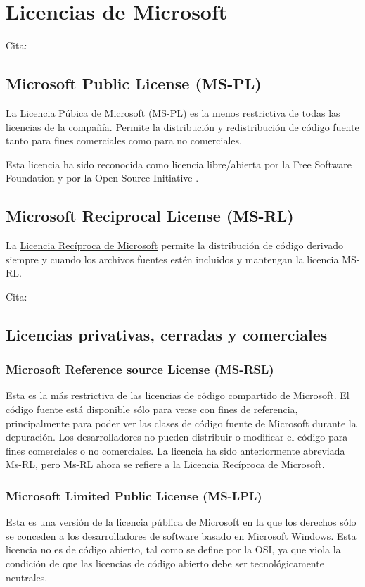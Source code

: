 \documentclass[10pt, titlepage]{article}
\begin{document}
\section{Licencias de Microsoft}
Cita: \cite{desde_linux_2020}

\subsection{Microsoft Public License (MS-PL)}
La \href{https://opensource.org/licenses/MS-PL}{Licencia Púbica de Microsoft (MS-PL)} \cite{microsoft_public_license_mspl} es la menos restrictiva de todas las licencias de la compañía. Permite la distribución y redistribución de código fuente tanto para fines comerciales como para no comerciales.

Esta licencia ha sido reconocida como licencia libre/abierta por la Free Software Foundation y por la Open Source Initiative \cite{desde_linux_2020}.

\subsection{Microsoft Reciprocal License (MS-RL)}
La \href{https://opensource.org/licenses/MS-RL}{Licencia Recíproca de Microsoft} permite la distribución de código derivado siempre y cuando los archivos fuentes estén incluidos y mantengan la licencia MS-RL.

Cita: \cite{microsoft_reciprocal_license_msrl}
\subsection{Licencias privativas, cerradas y comerciales}
\subsubsection{Microsoft Reference source License (MS-RSL)}
Esta es la más restrictiva de las licencias de código compartido de Microsoft. El código fuente está disponible sólo para verse con fines de referencia, principalmente para poder ver las clases de código fuente de Microsoft durante la depuración. Los desarrolladores no pueden distribuir o modificar el código para fines comerciales o no comerciales. La licencia ha sido anteriormente abreviada Ms-RL, pero Ms-RL ahora se refiere a la Licencia Recíproca de Microsoft.
\subsubsection{Microsoft Limited Public License (MS-LPL)}
Esta es una versión de la licencia pública de Microsoft en la que los derechos sólo se conceden a los desarrolladores de software basado en Microsoft Windows. Esta licencia no es de código abierto, tal como se define por la OSI, ya que viola la condición de que las licencias de código abierto debe ser tecnológicamente neutrales.
\end{document}
